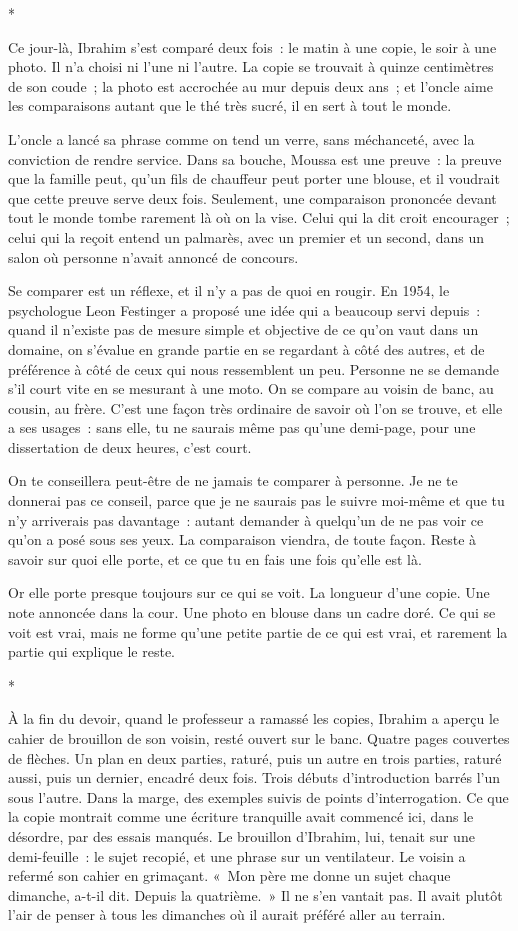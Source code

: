 \documentclass[10.5pt,twoside,openright]{book}
\newcommand{\asterisme}{\par\vspace{0.7em}\centerline{\color{gris}*\quad*\quad*}\vspace{0.7em}\par\noindent}
\begin{document}
\asterisme

Ce jour-là, Ibrahim s’est comparé deux fois : le matin à une copie, le soir à une photo. Il n’a choisi ni l’une ni l’autre. La copie se trouvait à quinze centimètres de son coude ; la photo est accrochée au mur depuis deux ans ; et l’oncle aime les comparaisons autant que le thé très sucré, il en sert à tout le monde.

L’oncle a lancé sa phrase comme on tend un verre, sans méchanceté, avec la conviction de rendre service. Dans sa bouche, Moussa est une preuve : la preuve que la famille peut, qu’un fils de chauffeur peut porter une blouse, et il voudrait que cette preuve serve deux fois. Seulement, une comparaison prononcée devant tout le monde tombe rarement là où on la vise. Celui qui la dit croit encourager ; celui qui la reçoit entend un palmarès, avec un premier et un second, dans un salon où personne n’avait annoncé de concours.

Se comparer est un réflexe, et il n’y a pas de quoi en rougir. En 1954, le psychologue Leon Festinger a proposé une idée qui a beaucoup servi depuis : quand il n’existe pas de mesure simple et objective de ce qu’on vaut dans un domaine, on s’évalue en grande partie en se regardant à côté des autres, et de préférence à côté de ceux qui nous ressemblent un peu. Personne ne se demande s’il court vite en se mesurant à une moto. On se compare au voisin de banc, au cousin, au frère. C’est une façon très ordinaire de savoir où l’on se trouve, et elle a ses usages : sans elle, tu ne saurais même pas qu’une demi-page, pour une dissertation de deux heures, c’est court.

On te conseillera peut-être de ne jamais te comparer à personne. Je ne te donnerai pas ce conseil, parce que je ne saurais pas le suivre moi-même et que tu n’y arriverais pas davantage : autant demander à quelqu’un de ne pas voir ce qu’on a posé sous ses yeux. La comparaison viendra, de toute façon. Reste à savoir sur quoi elle porte, et ce que tu en fais une fois qu’elle est là.

Or elle porte presque toujours sur ce qui se voit. La longueur d’une copie. Une note annoncée dans la cour. Une photo en blouse dans un cadre doré. Ce qui se voit est vrai, mais ne forme qu’une petite partie de ce qui est vrai, et rarement la partie qui explique le reste.

\asterisme

À la fin du devoir, quand le professeur a ramassé les copies, Ibrahim a aperçu le cahier de brouillon de son voisin, resté ouvert sur le banc. Quatre pages couvertes de flèches. Un plan en deux parties, raturé, puis un autre en trois parties, raturé aussi, puis un dernier, encadré deux fois. Trois débuts d’introduction barrés l’un sous l’autre. Dans la marge, des exemples suivis de points d’interrogation. Ce que la copie montrait comme une écriture tranquille avait commencé ici, dans le désordre, par des essais manqués. Le brouillon d’Ibrahim, lui, tenait sur une demi-feuille : le sujet recopié, et une phrase sur un ventilateur. Le voisin a refermé son cahier en grimaçant. « Mon père me donne un sujet chaque dimanche, a-t-il dit. Depuis la quatrième. » Il ne s’en vantait pas. Il avait plutôt l’air de penser à tous les dimanches où il aurait préféré aller au terrain.
\end{document}
